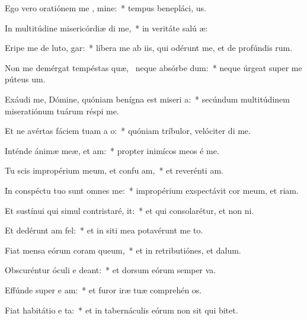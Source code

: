 \item Ego vero oratiónem me  , mine:~* tempus benepláci, us.
\item In multitúdine misericórdiæ  di me,~* in veritáte salú æ:
\item Eripe me de luto,   gar:~* líbera me ab iis, qui odérunt me, et de profúndis rum.
\item Non me demérgat tempéstas quæ,~\pscross{} neque absórbe  dum:~* neque úrgeat super me púteus  um.
\item Exáudi me, Dómine, quóniam benígna est miseri a:~* secúndum multitúdinem miseratiónum tuárum réspi  me.
\item Et ne avértas fáciem tuam a  o:~* quóniam tríbulor, velóciter di me.
\item Inténde ánimæ meæ, et  am:~* propter inimícos meos é me.
\item Tu scis impropérium meum, et confu am,~* et reverénti am.
\item In conspéctu tuo sunt omnes   me:~* impropérium exspectávit cor meum, et riam.
\item Et sustínui qui simul contristaré,   it:~* et qui consolarétur, et non ni.
\item Et dedérunt   am fel:~* et in siti mea potavérunt me to.
\item Fiat mensa eórum coram   queum,~* et in retributiónes, et  dalum.
\item Obscuréntur óculi e  deant:~* et dorsum eórum semper va.
\item Effúnde super e  am:~* et furor iræ tuæ comprehén os.
\item Fiat habitátio e ta:~* et in tabernáculis eórum non sit qui bitet.
